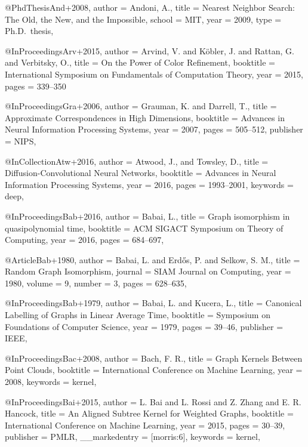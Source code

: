 @PhdThesis{And+2008,
  author = {Andoni, A.},
  title  = {Nearest Neighbor Search: {T}he Old, the New, and the Impossible},
  school = {MIT},
  year   = {2009},
  type   = {Ph.D.~thesis},
}

@InProceedings{Arv+2015,
  author    = {Arvind, V. and K{\"{o}}bler, J. and Rattan, G. and Verbitsky, O.},
  title     = {On the Power of Color Refinement},
  booktitle = {International Symposium on Fundamentals of Computation Theory},
  year      = {2015},
  pages     = {339--350}
}

@InProceedings{Gra+2006,
  author    = {Grauman, K. and Darrell, T.},
  title     = {Approximate Correspondences in High Dimensions},
  booktitle = {Advances in Neural Information Processing Systems},
  year      = {2007},
  pages     = {505--512},
  publisher = {NIPS},
}

@InCollection{Atw+2016,
  author    = {Atwood, J., and Towsley, D.},
  title     = {Diffusion-Convolutional Neural Networks},
  booktitle = {Advances in Neural Information Processing Systems},
  year      = {2016},
  pages     = {1993--2001},
  keywords  = {deep},
}

@InProceedings{Bab+2016,
  author    = {Babai, L.},
  title     = {Graph isomorphism in quasipolynomial time},
  booktitle = {{ACM} {SIGACT} Symposium on Theory of Computing},
  year      = {2016},
  pages     = {684--697},
}

@Article{Bab+1980,
  author  = {Babai, L. and Erd\H{o}s, P. and Selkow, S. M.},
  title   = {Random Graph Isomorphism},
  journal = {SIAM Journal on Computing},
  year    = {1980},
  volume  = {9},
  number  = {3},
  pages   = {628--635},
}

@InProceedings{Bab+1979,
  author    = {Babai, L. and Kucera, L.},
  title     = {Canonical Labelling of Graphs in Linear Average Time},
  booktitle = {Symposium on Foundations of Computer Science},
  year      = {1979},
  pages     = {39--46},
  publisher = {IEEE},
}

@InProceedings{Bac+2008,
  author    = {Bach, F. R.},
  title     = {Graph Kernels Between Point Clouds},
  booktitle = {International Conference on Machine Learning},
  year      = {2008},
  keywords  = {kernel},
}

@InProceedings{Bai+2015,
  author        = {L. Bai and L. Rossi and Z. Zhang and E. R. Hancock},
  title         = {An Aligned Subtree Kernel for Weighted Graphs},
  booktitle     = {International Conference on Machine Learning},
  year          = {2015},
  pages         = {30--39},
  publisher     = {PMLR},
  __markedentry = {[morris:6]},
  keywords      = {kernel},
}

